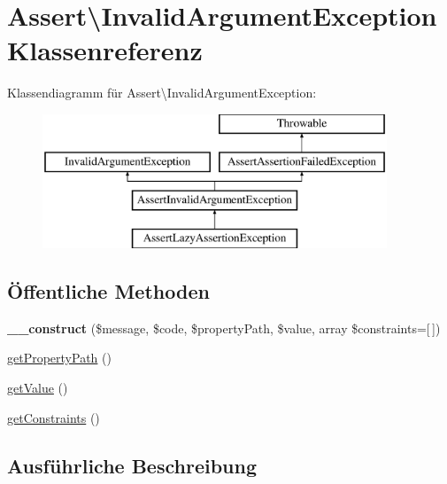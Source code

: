 \hypertarget{class_assert_1_1_invalid_argument_exception}{}\section{Assert\textbackslash{}Invalid\+Argument\+Exception Klassenreferenz}
\label{class_assert_1_1_invalid_argument_exception}
Klassendiagramm für Assert\textbackslash{}Invalid\+Argument\+Exception\+:\begin{figure}[H]
\begin{center}
\leavevmode
\includegraphics[height=4.000000cm]{class_assert_1_1_invalid_argument_exception}
\end{center}
\end{figure}
\subsection*{Öffentliche Methoden}
\begin{DoxyCompactItemize}
\item 
\mbox{\label{class_assert_1_1_invalid_argument_exception_a1557946c8bb2ececc0ff3a47d50dfaa2}} 
{\bfseries \+\_\+\+\_\+construct} (\$message, \$code, \$property\+Path, \$value, array \$constraints=\mbox{[}$\,$\mbox{]})
\item 
\mbox{\hyperlink{class_assert_1_1_invalid_argument_exception_ad40878e016aa62cd12ce509db06c9882}{get\+Property\+Path}} ()
\item 
\mbox{\hyperlink{class_assert_1_1_invalid_argument_exception_ad987d6866cd903ac8217836ddded8a92}{get\+Value}} ()
\item 
\mbox{\hyperlink{class_assert_1_1_invalid_argument_exception_a1c24a475f0988131f0193d74681eb121}{get\+Constraints}} ()
\end{DoxyCompactItemize}


\subsection{Ausführliche Beschreibung}


